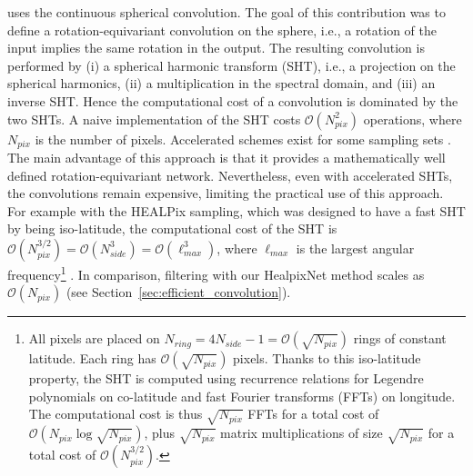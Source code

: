 \documentclass[final,twocolumn,3p,times,authoryear]{elsarticle}
\newcommand{\TK}[1]{{\color{red}{TK:#1}}}
\newcommand{\figref}[1]{Figure~\ref{fig:#1}}
\newcommand{\secref}[1]{Section~\ref{sec:#1}}
\newcommand{\1}{\b{1}}              %
\newcommand{\0}{\b{0}}              %
\newcommand{\bO}{\mathcal{O}}
\newcommand{\pkg}[1]{\texttt{#1}}
\begin{document}

\citet{cohen2018spherical} uses the continuous spherical convolution.
The goal of this contribution was to define a rotation-equivariant convolution on the sphere, i.e., a rotation of the input implies the same rotation in the output.
The resulting convolution is performed by (i) a spherical harmonic transform (SHT), i.e., a projection on the spherical harmonics, (ii) a  multiplication in the spectral domain, and (iii) an inverse SHT. Hence the computational cost of a convolution is dominated by the two SHTs.
A naive implementation of the SHT costs $\bO(N_{pix}^2)$ operations, where $N_{pix}$ is the number of pixels.
Accelerated schemes exist for some sampling sets \citep[see][for examples]{mohlenkamp1999fast, rokhlin2006fast, reinecke2013libsharp}.
The main advantage of this approach is that it provides a mathematically well defined rotation-equivariant network. Nevertheless, even with accelerated SHTs, the convolutions remain expensive, limiting the practical use of this approach.
For example with the HEALPix sampling, which was designed to have a fast SHT by being iso-latitude, the computational cost of the SHT is $\bO(N_{pix}^{3/2}) = \bO(N_{side}^3) = \bO(\ell_{max}^3)$, where $\ell_{max}$ is the largest angular frequency\footnote{All pixels are placed on $N_{ring} = 4N_{side}-1 = \bO\left(\sqrt{N_{pix}}\right)$ rings of constant latitude. Each ring has $\bO\left(\sqrt{N_{pix}}\right)$ pixels. Thanks to this iso-latitude property, the SHT is computed using recurrence relations for Legendre polynomials on co-latitude and fast Fourier transforms (FFTs) on longitude. The computational cost is thus $\sqrt{N_{pix}}$ FFTs for a total cost of $\bO\left( N_{pix} \log \sqrt{N_{pix}} \right)$, plus $\sqrt{N_{pix}}$ matrix multiplications of size $\sqrt{N_{pix}}$ for a total cost of $\bO\left(N_{pix}^{3/2}\right)$.}
\citep{gorski2005healpix, reinecke2013libsharp}.
In comparison, filtering with our HealpixNet method scales as $\bO(N_{pix})$ (see \secref{efficient_convolution}).
\end{document}
